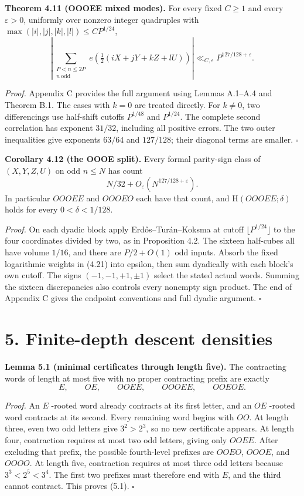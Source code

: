 \documentclass[11pt,a4paper]{article}
\begin{document}
\textbf{Theorem 4.11 (OOOEE mixed modes).} For every fixed \(C\ge1\) and
every \(\varepsilon>0\), uniformly over nonzero integer quadruples with
\(\max(|i|,|j|,|k|,|l|)\le CP^{1/24}\), \[
\left|\sum_{\substack{P<n\le2P\\n\ \mathrm{odd}}}
e\left(\tfrac12(iX+jY+kZ+lU)\right)\right|
\ll_{C,\varepsilon}P^{127/128+\varepsilon}.
\tag{4.21}
\]

\emph{Proof.} Appendix C provides the full argument using Lemmas
A.1--A.4 and Theorem B.1. The cases with \(k=0\) are treated directly.
For \(k\ne0\), two differencings use half-shift cutoffs \(P^{1/48}\) and
\(P^{1/24}\). The complete second correlation has exponent \(31/32\),
including all positive errors. The two outer inequalities give exponents
\(63/64\) and \(127/128\); their diagonal terms are smaller. \(\square\)


\textbf{Corollary 4.12 (the OOOE split).} Every formal parity-sign class
of \((X,Y,Z,U)\) on odd \(n\le N\) has count \[
N/32+O_\varepsilon(N^{127/128+\varepsilon}).
\tag{4.22}
\] In particular \(OOOEE\) and \(OOOEO\) each have that count, and
\(\mathrm H(OOOEE;\delta)\) holds for every \(0<\delta<1/128\).

\emph{Proof.} On each dyadic block apply Erd\H{o}s--Tur\'{a}n--Koksma at
cutoff \(\lfloor P^{1/24}\rfloor\) to the four coordinates divided by
two, as in Proposition 4.2. The sixteen half-cubes all have volume
\(1/16\), and there are \(P/2+O(1)\) odd inputs. Absorb the fixed
logarithmic weights in (4.21) into epsilon, then sum dyadically with
each block's own cutoff. The signs \((-1,-1,+1,\pm1)\) select the stated
actual words. Summing the sixteen discrepancies also controls every
nonempty sign product. The end of Appendix C gives the endpoint
conventions and full dyadic argument. \(\square\)

\section{5. Finite-depth descent
densities}\label{finite-depth-descent-densities}


\textbf{Lemma 5.1 (minimal certificates through length five).} The
contracting words of length at most five with no proper contracting
prefix are exactly \[
E,\qquad OE,\qquad OOEE,\qquad OOOEE,\qquad OOEOE.
\tag{5.1}
\]

\emph{Proof.} An \(E\) -rooted word already contracts at its first
letter, and an \(OE\) -rooted word contracts at its second. Every
remaining word begins with \(OO\). At length three, even two odd letters
give \(3^2>2^3\), so no new certificate appears. At length four,
contraction requires at most two odd letters, giving only \(OOEE\).
After excluding that prefix, the possible fourth-level prefixes are
\(OOEO\), \(OOOE\), and \(OOOO\). At length five, contraction requires
at most three odd letters because \(3^3<2^5<3^4\). The first two
prefixes must therefore end with \(E\), and the third cannot contract.
This proves (5.1). \(\square\)
\end{document}
